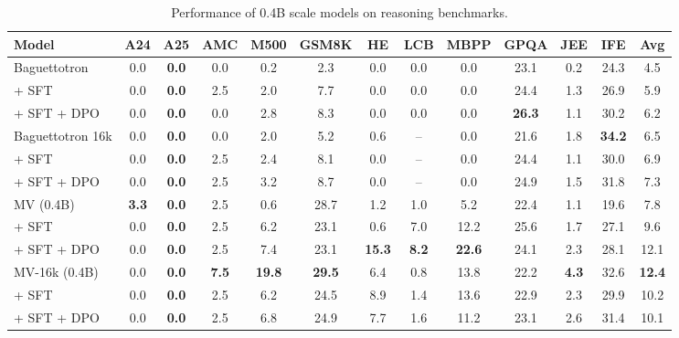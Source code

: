 \begin{table}[ht]
\centering
\caption{Performance of 0.4B scale models on reasoning benchmarks.}
\label{tab:evalchemy_table4}
\scriptsize
\begin{tabular}{lcccccccccccc}
\toprule
\textbf{Model} & \textbf{A24} & \textbf{A25} & \textbf{AMC} & \textbf{M500} & \textbf{GSM8K} & \textbf{HE} & \textbf{LCB} & \textbf{MBPP} & \textbf{GPQA} & \textbf{JEE} & \textbf{IFE} & \textbf{Avg} \\
\midrule
Baguettotron & 0.0 & \textbf{0.0} & 0.0 & 0.2 & 2.3 & 0.0 & 0.0 & 0.0 & 23.1 & 0.2 & 24.3 & 4.5 \\
\quad + SFT & 0.0 & \textbf{0.0} & 2.5 & 2.0 & 7.7 & 0.0 & 0.0 & 0.0 & 24.4 & 1.3 & 26.9 & 5.9 \\
\quad + SFT + DPO & 0.0 & \textbf{0.0} & 0.0 & 2.8 & 8.3 & 0.0 & 0.0 & 0.0 & \textbf{26.3} & 1.1 & 30.2 & 6.2 \\
\midrule
\addlinespace[0.3em]
Baguettotron 16k & 0.0 & \textbf{0.0} & 0.0 & 2.0 & 5.2 & 0.6 & -- & 0.0 & 21.6 & 1.8 & \textbf{34.2} & 6.5 \\
\quad + SFT & 0.0 & \textbf{0.0} & 2.5 & 2.4 & 8.1 & 0.0 & -- & 0.0 & 24.4 & 1.1 & 30.0 & 6.9 \\
\quad + SFT + DPO & 0.0 & \textbf{0.0} & 2.5 & 3.2 & 8.7 & 0.0 & -- & 0.0 & 24.9 & 1.5 & 31.8 & 7.3 \\
\midrule
\addlinespace[0.3em]
MV (0.4B) & \textbf{3.3} & \textbf{0.0} & 2.5 & 0.6 & 28.7 & 1.2 & 1.0 & 5.2 & 22.4 & 1.1 & 19.6 & 7.8 \\
\quad + SFT & 0.0 & \textbf{0.0} & 2.5 & 6.2 & 23.1 & 0.6 & 7.0 & 12.2 & 25.6 & 1.7 & 27.1 & 9.6 \\
\quad + SFT + DPO & 0.0 & \textbf{0.0} & 2.5 & 7.4 & 23.1 & \textbf{15.3} & \textbf{8.2} & \textbf{22.6} & 24.1 & 2.3 & 28.1 & 12.1 \\
\midrule
\addlinespace[0.3em]
MV-16k (0.4B) & 0.0 & \textbf{0.0} & \textbf{7.5} & \textbf{19.8} & \textbf{29.5} & 6.4 & 0.8 & 13.8 & 22.2 & \textbf{4.3} & 32.6 & \textbf{12.4} \\
\quad + SFT & 0.0 & \textbf{0.0} & 2.5 & 6.2 & 24.5 & 8.9 & 1.4 & 13.6 & 22.9 & 2.3 & 29.9 & 10.2 \\
\quad + SFT + DPO & 0.0 & \textbf{0.0} & 2.5 & 6.8 & 24.9 & 7.7 & 1.6 & 11.2 & 23.1 & 2.6 & 31.4 & 10.1 \\
\bottomrule
\end{tabular}
\end{table}


